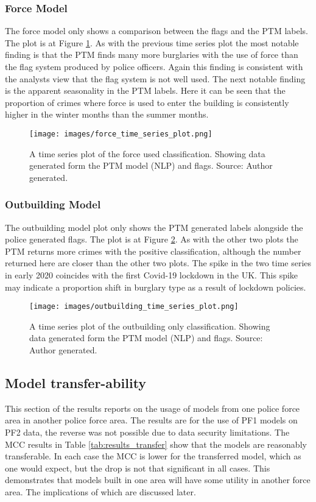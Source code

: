 \subsubsection{Force Model}The force model only shows a comparison between the flags and the PTM labels. The plot is at Figure \ref{fig:force_ts}. As with the previous time series plot the most notable finding is that the PTM  finds many more burglaries with the use of force than the flag system produced by police officers. Again this finding is consistent with the analysts view that the flag system is not well used. The next notable finding is the apparent seasonality in the PTM labels. Here it can be seen that the proportion of crimes where force is used to enter the building is consistently higher in the winter months than the summer months.   


\begin{figure}
  \texttt{[image: images/force\_time\_series\_plot.png]}
  \caption[Force used model time series plot]{A time series plot of the force used classification. Showing data generated form the PTM model (NLP) and flags. Source: Author generated.}
  \label{fig:force_ts}
\end{figure}


\subsubsection{Outbuilding Model} The outbuilding model plot only shows the PTM generated labels alongside the police generated flags. The plot is at Figure \ref{fig:outbuild_ts}. As with the other two plots the PTM returns more crimes with the positive classification, although the number returned here are closer than the other two plots. The spike in the two time series in early 2020 coincides with the first Covid-19 lockdown in the UK. This spike may indicate a proportion shift in burglary type as a result of lockdown policies.


\begin{figure}
  \texttt{[image: images/outbuilding\_time\_series\_plot.png]}
  \caption[Outbuilding only model time series plot]{A time series plot of the outbuilding only classification. Showing data generated form the PTM model (NLP) and flags. Source: Author generated.}
  \label{fig:outbuild_ts}
\end{figure}

\subsection{Model transfer-ability} This section of the results reports on the usage of models from one police force area in another police force area. The results are for  the use of PF1 models on PF2 data, the reverse was not possible due to data security limitations. The MCC results in Table \ref{tab:results_transfer} show that the models are reasonably transferable. In each case the MCC is lower for the transferred model, which as one would expect, but the drop is not that significant in all cases. This demonstrates that models built in one area will have some utility in another force area. The implications of which are discussed later.  


